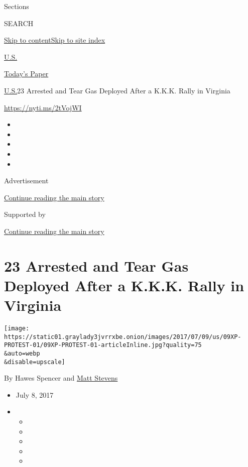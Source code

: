 Sections

SEARCH

\protect\hyperlink{site-content}{Skip to
content}\protect\hyperlink{site-index}{Skip to site index}

\href{https://www.nytimes3xbfgragh.onion/section/us}{U.S.}

\href{https://myaccount.nytimes3xbfgragh.onion/auth/login?response_type=cookie\&client_id=vi}{}

\href{https://www.nytimes3xbfgragh.onion/section/todayspaper}{Today's
Paper}

\href{/section/us}{U.S.}\textbar{}23 Arrested and Tear Gas Deployed
After a K.K.K. Rally in Virginia

\url{https://nyti.ms/2tVojWI}

\begin{itemize}
\item
\item
\item
\item
\item
\end{itemize}

Advertisement

\protect\hyperlink{after-top}{Continue reading the main story}

Supported by

\protect\hyperlink{after-sponsor}{Continue reading the main story}

\hypertarget{23-arrested-and-tear-gas-deployed-after-a-kkk-rally-in-virginia}{%
\section{23 Arrested and Tear Gas Deployed After a K.K.K. Rally in
Virginia}\label{23-arrested-and-tear-gas-deployed-after-a-kkk-rally-in-virginia}}

\texttt{[image: https://static01.graylady3jvrrxbe.onion/images/2017/07/09/us/09XP-PROTEST-01/09XP-PROTEST-01-articleInline.jpg?quality=75\\\&auto=webp\\\&disable=upscale]}

By Hawes Spencer and
\href{https://www.nytimes3xbfgragh.onion/by/matt-stevens}{Matt Stevens}

\begin{itemize}
\item
  July 8, 2017
\item
  \begin{itemize}
  \item
  \item
  \item
  \item
  \item
  \end{itemize}
\end{itemize}

